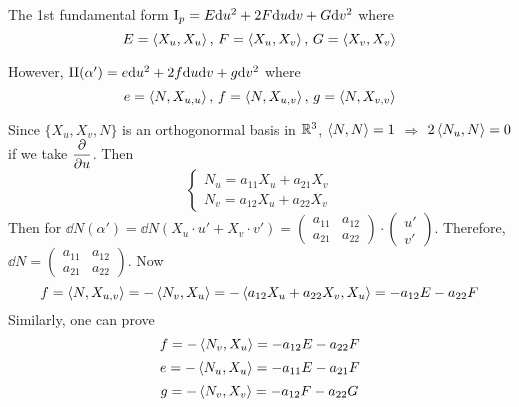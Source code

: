 The 1st fundamental form $ \Romannumer1_p=E\dd u^2+2F\dd u\dd v+G\dd v^2 $ where 
\begin{equation}
    E=\left<X_u,X_u\right>,\,F=\left<X_u,X_v\right>,\,G=\left<X_v,X_v\right>
\end{equation} 

However,
$ \Romannumer2(\alpha')=e\dd u^2+2f\dd u\dd v+g\dd v^2 $ where
\begin{equation}
    e=\left<N,X_{u,u}\right>,\, f=\left<N,X_{u,v}\right>,\, g=\left<N,X_{v,v}\right>
\end{equation} 

Since  $ \{X_u,X_v, N\} $ is an orthogonormal basis in  $ \mathbb R^3 $,  $ \left<N,N\right>=1 $  $ \Rightarrow  $  $ 2\left<N_u,N\right>=0 $ if we take  $ \displaystyle\frac{\partial }{\partial u} $. Then 
\[\begin{cases}
    N_u=a_{11}X_u+a_{21}X_v\\
    N_v=a_{12}X_u+a_{22}X_v
\end{cases}\]  
Then for  $ \dd N(\alpha')=\dd N(X_u\cdot u'+X_v\cdot v')=\begin{pmatrix}
    a_{11}&a_{12}\\
    a_{21}&a_{22}
\end{pmatrix}\cdot\begin{pmatrix}
    u'\\
    v'
\end{pmatrix}$. Therefore,  $ \dd N=\begin{pmatrix}
    a_{11}&a_{12}\\
    a_{21}&a_{22}
\end{pmatrix} $. Now 
\[f=\left<N,X_{u,v}\right>=-\left<N_v,X_u\right>=-\left<a_{12}X_u+a_{22}X_v,X_u\right>=-a_{12}E-a_{22}F\]
Similarly, one can prove 
\[f=-\left<N_v,X_u\right>=-a_{12}E-a_{22}F\]
\[e=-\left<N_u,X_u\right>=-a_{11}E-a_{21}F\]
\[g=-\left<N_v,X_v\right>=-a_{12}F-a_{22}G\]

